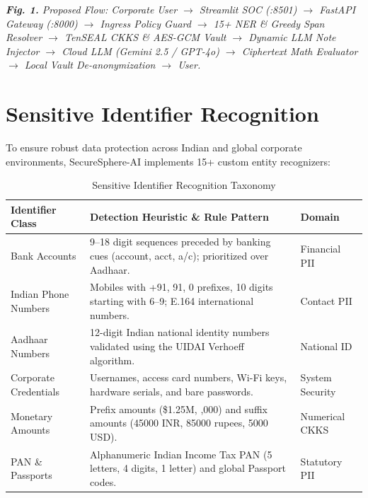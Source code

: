 \documentclass[10pt,a4paper]{article}
\begin{document}
\begin{center}
\small\itshape
\textbf{Fig. 1.} Proposed Flow: Corporate User $\to$ Streamlit SOC (:8501) $\to$ FastAPI Gateway (:8000) $\to$ Ingress Policy Guard $\to$ 15+ NER \& Greedy Span Resolver $\to$ TenSEAL CKKS \& AES-GCM Vault $\to$ Dynamic LLM Note Injector $\to$ Cloud LLM (Gemini 2.5 / GPT-4o) $\to$ Ciphertext Math Evaluator $\to$ Local Vault De-anonymization $\to$ User.
\end{center}

\section{Sensitive Identifier Recognition}
To ensure robust data protection across Indian and global corporate environments, SecureSphere-AI implements 15+ custom entity recognizers:

\begin{table}[h]
\centering
\small
\begin{tabular}{p{}p{}p{}}
\toprule
\textbf{Identifier Class} & \textbf{Detection Heuristic \& Rule Pattern} & \textbf{Domain} \\
\midrule
Bank Accounts & 9--18 digit sequences preceded by banking cues (account, acct, a/c); prioritized over Aadhaar. & Financial PII \\
Indian Phone Numbers & Mobiles with +91, 91, 0 prefixes, 10 digits starting with 6--9; E.164 international numbers. & Contact PII \\
Aadhaar Numbers & 12-digit Indian national identity numbers validated using the UIDAI Verhoeff algorithm. & National ID \\
Corporate Credentials & Usernames, access card numbers, Wi-Fi keys, hardware serials, and bare passwords. & System Security \\
Monetary Amounts & Prefix amounts (\$1.25M, \rupee45,000) and suffix amounts (45000 INR, 85000 rupees, 5000 USD). & Numerical CKKS \\
PAN \& Passports & Alphanumeric Indian Income Tax PAN (5 letters, 4 digits, 1 letter) and global Passport codes. & Statutory PII \\
\bottomrule
\end{tabular}
\caption{Sensitive Identifier Recognition Taxonomy}
\end{table}
\end{document}
